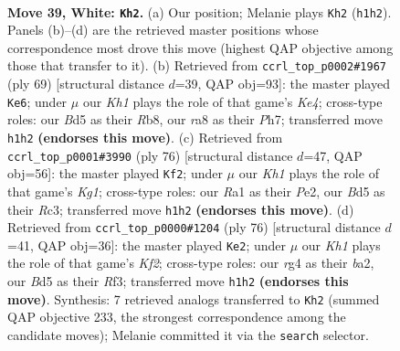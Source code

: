 \documentclass[11pt]{article}
\begin{document}
\clearpage

\begin{figure}[p]\centering
\begin{subfigure}{0.46\textwidth}\centering
\resizebox{\linewidth}{!}{%
\newchessgame
\chessboard[
  setfen={r7/pp3p2/6k1/3B3p/bP2P1r1/P6p/8/R4R1K w - - 4 39},
  showmover=false,
  pgfstyle=straightmove, color=movearrow, markmove={h1-h2}
]}
\caption{}
\end{subfigure}\hfill
\begin{subfigure}{0.46\textwidth}\centering
\resizebox{\linewidth}{!}{%
\newchessgame
\chessboard[
  setfen={1r1b4/R4p1p/1P1r2p1/B3k3/8/3p1P2/5P1P/1R1K4 b - - 3 35},
  showmover=false,
  pgfstyle=straightmove, color=movearrow, markmove={e5-e6}
]}
\caption{}
\end{subfigure}
\\[4pt]
\begin{subfigure}{0.46\textwidth}\centering
\resizebox{\linewidth}{!}{%
\newchessgame
\chessboard[
  setfen={2r3k1/p4p2/2p3rb/3p4/3B4/1PR3P1/P3P3/3R2K1 w - - 1 39},
  showmover=false,
  pgfstyle=straightmove, color=movearrow, markmove={g1-f2}
]}
\caption{}
\end{subfigure}\hfill
\begin{subfigure}{0.46\textwidth}\centering
\resizebox{\linewidth}{!}{%
\newchessgame
\chessboard[
  setfen={5rk1/p1p5/1p6/3P3p/2P2p2/1P3R1P/b2B1K2/8 w - - 0 39},
  showmover=false,
  pgfstyle=straightmove, color=movearrow, markmove={f2-e2}
]}
\caption{}
\end{subfigure}
\caption{\textbf{Move 39, White: \texttt{Kh2}.} (a) Our position; Melanie plays \texttt{Kh2} (\texttt{h1h2}). Panels (b)--(d) are the retrieved master positions whose correspondence most drove this move (highest QAP objective among those that transfer to it). (b) Retrieved from \texttt{ccrl\_top\_p0002\#1967} (ply 69) [structural distance $d$=39, QAP obj=93]: the master played \texttt{Ke6}; under $\mu$ our \emph{Kh1} plays the role of that game's \emph{Ke4}; cross-type roles: our \emph{B}d5 as their \emph{R}b8, our \emph{r}a8 as their \emph{P}h7; transferred move \texttt{h1h2} \textbf{(endorses this move)}. (c) Retrieved from \texttt{ccrl\_top\_p0001\#3990} (ply 76) [structural distance $d$=47, QAP obj=56]: the master played \texttt{Kf2}; under $\mu$ our \emph{Kh1} plays the role of that game's \emph{Kg1}; cross-type roles: our \emph{R}a1 as their \emph{P}e2, our \emph{B}d5 as their \emph{R}c3; transferred move \texttt{h1h2} \textbf{(endorses this move)}. (d) Retrieved from \texttt{ccrl\_top\_p0000\#1204} (ply 76) [structural distance $d$=41, QAP obj=36]: the master played \texttt{Ke2}; under $\mu$ our \emph{Kh1} plays the role of that game's \emph{Kf2}; cross-type roles: our \emph{r}g4 as their \emph{b}a2, our \emph{B}d5 as their \emph{R}f3; transferred move \texttt{h1h2} \textbf{(endorses this move)}. Synthesis: 7 retrieved analogs transferred to \texttt{Kh2} (summed QAP objective 233, the strongest correspondence among the candidate moves); Melanie committed it via the \texttt{search} selector.}
\label{fig:thought-m76}
\end{figure}
\end{document}
